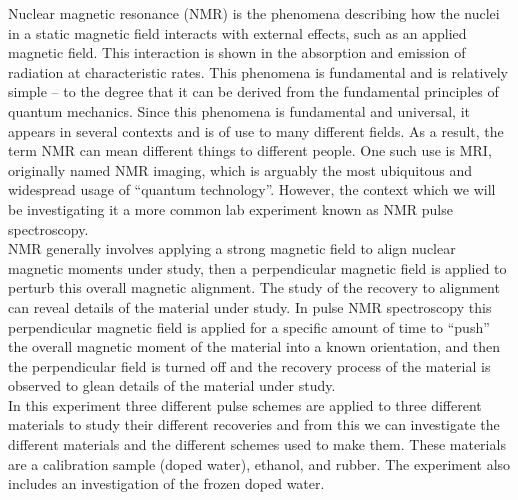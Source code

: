 Nuclear magnetic resonance (NMR) is the phenomena describing how the nuclei in a static magnetic field interacts with external effects, such as an applied magnetic field. This interaction is shown in the absorption and emission of radiation at characteristic rates. This phenomena is fundamental and is relatively simple -- to the degree that it can be derived from the fundamental principles of quantum mechanics. Since this phenomena is fundamental and universal, it appears in several contexts and is of use to many different fields. As a result, the term NMR can mean different things to different people. One such use is MRI, originally named NMR imaging, which is arguably the most ubiquitous and widespread usage of ``quantum technology''. However, the context which we will be investigating it a more common lab experiment known as NMR pulse spectroscopy. \\

NMR generally involves applying a strong magnetic field to align nuclear magnetic moments under study, then a perpendicular magnetic field is applied to perturb this overall magnetic alignment. The study of the recovery to alignment can reveal details of the material under study. In pulse NMR spectroscopy this perpendicular magnetic field is applied for a specific amount of time to ``push'' the overall magnetic moment of the material into a known orientation, and then the perpendicular field is turned off and the recovery process of the material is observed to glean details of the material under study.\\

In this experiment three different pulse schemes are applied to three different materials to study their different recoveries and from this we can investigate the different materials and the different schemes used to make them. These materials are a calibration sample (doped water), ethanol, and rubber. The experiment also includes an investigation of the frozen doped water.\\

\newpage




